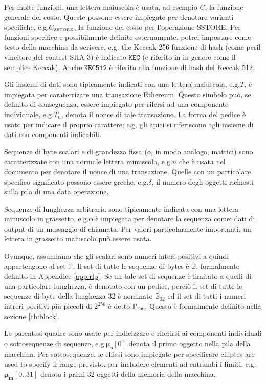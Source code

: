 \documentclass[9pt,oneside]{amsart}
\makeatletter
\newcommand*\eg{e.g.\@\xspace}
\makeatother
\begin{document}
\begin{multicols}{2}
Per molte funzioni, una lettera maiuscola è usata, ad esempio $C$, la funzione generale del costo. Queste possono essere impiegate per denotare varianti specifiche, \eg $C_\text{\tiny SSTORE}$, la funzione del costo per l'operazione {\tiny SSTORE}. Per funzioni specifice e possibilmente definite esternamente, potrei impostare come testo della macchina da scrivere, \eg the Keccak-256 funzione di hash (come peril vincitore del contest SHA-3) è indicato $\texttt{KEC}$ (e riferito in in genere come il semplice Keccak). Anche $\texttt{KEC512}$ è riferito alla funzione di hash del Keccak 512.

Gli insiemi di dati sono tipicamente indicati con una lettera maiuscola, \eg $T$, è impiegata per caraterrizare una transazione Ethereum. Questo simbolo può, se definito di conseguenza, essere impiegato per rifersi ad una componente individuale, \eg $T_n$, denota il nonce di tale transazione. La forma del pedice è usato per indicare il proprio carattere; \eg gli apici si riferiscono agli insieme di dati con componenti indicabili.

Sequenze di byte scalari e di grandezza fissa (o, in modo analogo, matrici) sono caratterizzate con una normale lettera minuscola, \eg $n$ che è usata nel documento per denotare il nonce di una transazione. Quelle con un particolare specifico significato possono essere greche, \eg $\delta$, il numero degli oggetti richiesti sulla pila di una data operazione.

Sequenze di lunghezza arbitraria sono tipicamente indicata con una lettera minuscolo in grassetto, \eg $\mathbf{o}$ è impiegata per denotare la sequenza comei dati di output di un messaggio di chiamata. Per valori particolarmente importanti, un lettera in grassetto maiuscolo può essere usata.

Ovunque, assumiamo che gli scalari sono numeri interi positivi a quindi appartengono al set $\mathbb{P}$. Il set di tutte le sequenze di bytes è $\mathbb{B}$, formalmente definito in Appendice \ref{app:rlp}. Se un tale set di sequenze è limitato a quelli di una particolare lunghezza, è denotato con un pedice, perciò il set di tutte le sequenze di byte della lunghezza $32$ è nominato $\mathbb{B}_{32}$ ed il set di tutti i numeri intreri positivi più piccoli di $2^{256}$ è detto $\mathbb{P}_{256}$. Questo è formalmente definito nella sezione \ref{ch:block}.

Le parentesi quadre sono usate per indicizzare e riferirsi ai componenti individuali o sottosequenze di sequenze, \eg $\boldsymbol{\mu}_\mathbf{s}[0]$ denota il primo oggetto nella pila della macchina. Per sottosequenze, le ellissi sono impiegate per specificare ellipses are used to specify il range previsto, per includere elementi ad entrambi i limiti, \eg $\boldsymbol{\mu}_\mathbf{m}[0..31]$ denota i primi 32 oggetti della memoria della macchina.


\end{multicols}
\end{document}
